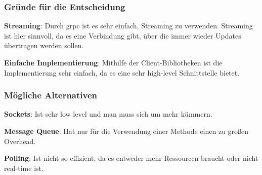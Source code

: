 \subsubsection{Gründe für die Entscheidung}\label{subsubsec:grunde-fur-die-entscheidung-01}

\textbf{Streaming}: Durch grpc ist es sehr einfach, Streaming zu verwenden.
Streaming ist hier sinnvoll, da es eine Verbindung gibt, über die immer wieder Updates übertragen werden sollen.

\textbf{Einfache Implementierung}: Mithilfe der Client-Bibliotheken ist die Implementierung sehr einfach, da es eine
sehr high-level Schnittstelle bietet.

\subsubsection{Mögliche Alternativen}\label{subsubsec:mogliche-alternativen-01}

\textbf{Sockets}: Ist sehr low level und man muss sich um mehr kümmern.

\textbf{Message Queue}: Hat nur für die Verwendung einer Methode einen zu großen Overhead.

\textbf{Polling}: Ist nicht so effizient, da es entweder mehr Ressourcen braucht oder nicht real-time ist.